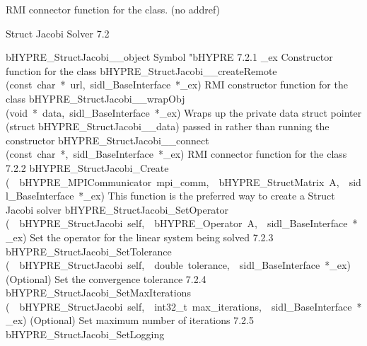 \documentclass{article}
\begin{document}
\begin{cxxentry}
\begin{cxxentry}
\begin{cxxvariable}
\begin{cxxdoc}
RMI connector function for the class. (no addref)
\end{cxxdoc}
\end{cxxvariable}
\end{cxxentry}
\begin{cxxentry}
{}
        {Struct Jacobi Solver}
        {}
        {
}
        {7.2}
\begin{cxxnames}
        {bHYPRE\_StructJacobi\_\_object}
        {}
        {
Symbol "bHYPRE}
        {7.2.1}
        {\_ex}
        {}
        {
Constructor function for the class}
        {}
\label{cxx.7.2.11}
        {bHYPRE\_StructJacobi\_\_createRemote}
        {(const\ char\ *\ url,\ sidl\_BaseInterface\ *\_ex)}
        {
RMI constructor function for the class}
        {}
\label{cxx.7.2.12}
        {bHYPRE\_StructJacobi\_\_wrapObj}
        {(void\ *\ data,\ sidl\_BaseInterface\ *\_ex)}
        {
Wraps up the private data struct pointer (struct bHYPRE\_StructJacobi\_\_data) passed in rather than running the constructor}
        {}
\label{cxx.7.2.13}
        {bHYPRE\_StructJacobi\_\_connect}
        {(const\ char\ *,\ sidl\_BaseInterface\ *\_ex)}
        {
RMI connector function for the class}
        {7.2.2}
        {bHYPRE\_StructJacobi\_Create}
        {(\ \ bHYPRE\_MPICommunicator\ mpi\_comm,\ \ bHYPRE\_StructMatrix\ A,\ \ sidl\_BaseInterface\ *\_ex)}
        {
This function is the preferred way to create a Struct Jacobi solver}
        {}
\label{cxx.7.2.14}
        {bHYPRE\_StructJacobi\_SetOperator}
        {(\ \ bHYPRE\_StructJacobi\ self,\ \ bHYPRE\_Operator\ A,\ \ sidl\_BaseInterface\ *\_ex)}
        {
Set the operator for the linear system being solved}
        {7.2.3}
        {bHYPRE\_StructJacobi\_SetTolerance}
        {(\ \ bHYPRE\_StructJacobi\ self,\ \ double\ tolerance,\ \ sidl\_BaseInterface\ *\_ex)}
        {
(Optional) Set the convergence tolerance}
        {7.2.4}
        {bHYPRE\_StructJacobi\_SetMaxIterations}
        {(\ \ bHYPRE\_StructJacobi\ self,\ \ int32\_t\ max\_iterations,\ \ sidl\_BaseInterface\ *\_ex)}
        {
(Optional) Set maximum number of iterations}
        {7.2.5}
        {bHYPRE\_StructJacobi\_SetLogging}

\end{cxxnames}
\end{cxxentry}
\end{cxxentry}
\end{document}
